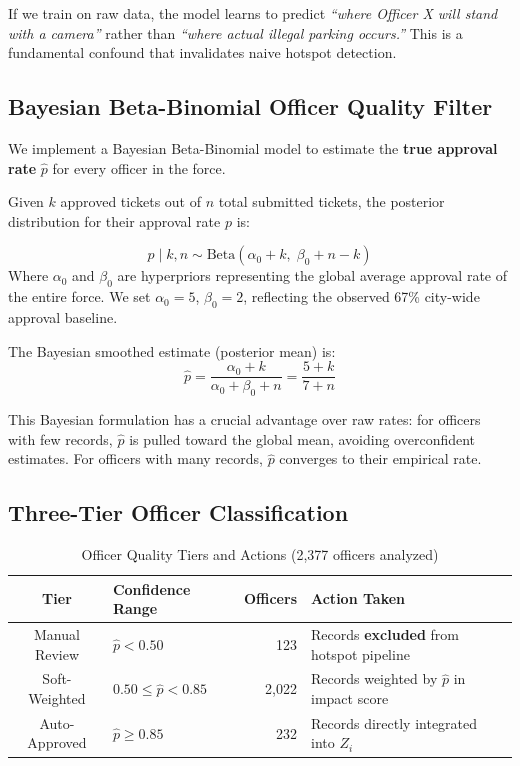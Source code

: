 \documentclass[12pt,a4paper]{article}
\begin{document}
If we train on raw data, the model learns to predict \textit{``where Officer X will stand with a camera''} rather than \textit{``where actual illegal parking occurs.''} This is a fundamental confound that invalidates naive hotspot detection.

\subsection{Bayesian Beta-Binomial Officer Quality Filter}

We implement a Bayesian Beta-Binomial model to estimate the \textbf{true approval rate} $\hat{p}$ for every officer in the force.

Given $k$ approved tickets out of $n$ total submitted tickets, the posterior distribution for their approval rate $p$ is:

\begin{tcolorbox}[formulabox]
\begin{equation}
    p \mid k, n \sim \text{Beta}(\alpha_0 + k,\; \beta_0 + n - k)
    \label{eq:beta_posterior}
\end{equation}
Where $\alpha_0$ and $\beta_0$ are hyperpriors representing the global average approval rate of the entire force. We set $\alpha_0 = 5$, $\beta_0 = 2$, reflecting the observed 67\% city-wide approval baseline.

The Bayesian smoothed estimate (posterior mean) is:
\begin{equation}
    \hat{p} = \frac{\alpha_0 + k}{\alpha_0 + \beta_0 + n} = \frac{5 + k}{7 + n}
    \label{eq:bayes_estimate}
\end{equation}
\end{tcolorbox}

This Bayesian formulation has a crucial advantage over raw rates: for officers with few records, $\hat{p}$ is pulled toward the global mean, avoiding overconfident estimates. For officers with many records, $\hat{p}$ converges to their empirical rate.

\subsection{Three-Tier Officer Classification}

\begin{table}[H]
\centering
\caption{Officer Quality Tiers and Actions (2,377 officers analyzed)}
\begin{tabular}{clrp{5cm}}
\toprule
\textbf{Tier} & \textbf{Confidence Range} & \textbf{Officers} & \textbf{Action Taken} \\
\midrule
\rowcolor{alertred!10} Manual Review & $\hat{p} < 0.50$ & 123 & Records \textbf{excluded} from hotspot pipeline \\
\rowcolor{gold!10} Soft-Weighted & $0.50 \leq \hat{p} < 0.85$ & 2,022 & Records weighted by $\hat{p}$ in impact score \\
\rowcolor{emerald!10} Auto-Approved & $\hat{p} \geq 0.85$ & 232 & Records directly integrated into $Z_i$ \\
\bottomrule
\end{tabular}
\end{table}
\end{document}
